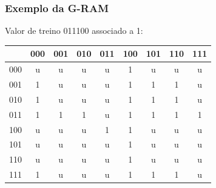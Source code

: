 \documentclass{beamer}
\begin{document}
\begin{frame}
    \frametitle{Exemplo da G-RAM}
    Valor de treino 011100 associado a 1:

    \begin{table}
        \centering
        \begin{tabular}{|c|c|c|c|c|c|c|c|c|}
            \hline
                &       000 &       001 &       010 &       011 &       100 &       101 &       110 &       111\\
            \hline
            000 &        u  &        u  &        u  &        u  &        1  &        u  &        u  &        u \\
            \hline
            001 &        1  &        u  &        u  &        u  &        1  &        1  &        1  &        u \\
            \hline
            010 &        1  &        u  &        u  &        u  &        1  &        1  &        1  &        u \\
            \hline
            011 &        1  &        1  &        1  &        u  &        1  &        1  &        1  &        1 \\
            \hline
            100 &        u  &        u  &        u  & \alert 1  &        1  &        u  &        u  &        u \\
            \hline
            101 &        u  &        u  &        u  &        u  &        1  &        u  &        u  &        u \\
            \hline
            110 &        u  &        u  &        u  &        u  &        1  &        u  &        u  &        u \\
            \hline
            111 &        1  &        u  &        u  &        u  &        1  &        1  &        1  &        u \\
            \hline

        \end{tabular}
    \end{table}
\end{frame}
\end{document}
